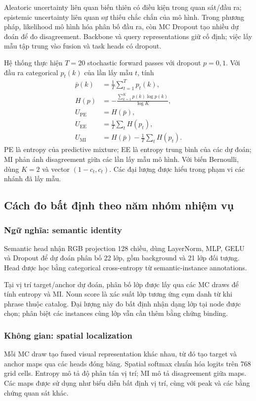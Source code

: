 \documentclass[12pt,a4paper]{article}
\begin{document}
Aleatoric uncertainty liên quan biến thiên có điều kiện trong quan sát/đầu ra; epistemic uncertainty liên quan sự thiếu chắc chắn của mô hình. Trong phương pháp, likelihood mô hình hóa phân bố đầu ra, còn MC Dropout tạo nhiều dự đoán để đo disagreement. Backbone và query representations giữ cố định; việc lấy mẫu tập trung vào fusion và task heads có dropout.

Hệ thống thực hiện $T=20$ stochastic forward passes với dropout $p=0{,}1$. Với đầu ra categorical $p_t(k)$ của lần lấy mẫu $t$, tính
\begin{align}
\bar p(k)&=\frac1T\sum_{t=1}^{T}p_t(k),\\
H(p)&=-\frac{\sum_{k=1}^{K}p(k)\log p(k)}{\log K},\\
U_{\mathrm{PE}}&=H(\bar p),\\
U_{\mathrm{EE}}&=\frac1T\sum_tH(p_t),\\
U_{\mathrm{MI}}&=H(\bar p)-\frac1T\sum_tH(p_t).
\end{align}
PE là entropy của predictive mixture; EE là entropy trung bình của các dự đoán; MI phản ánh disagreement giữa các lần lấy mẫu mô hình. Với biến Bernoulli, dùng $K=2$ và vector $(1-c_t,c_t)$. Các đại lượng được hiểu trong phạm vi các nhánh đã lấy mẫu.

\subsection{Cách đo bất định theo năm nhóm nhiệm vụ}
\subsubsection{Ngữ nghĩa: semantic identity}
Semantic head nhận RGB projection 128 chiều, dùng LayerNorm, MLP, GELU và Dropout để dự đoán phân bố 22 lớp, gồm background và 21 lớp đối tượng. Head được học bằng categorical cross-entropy từ semantic-instance annotations.

Tại vị trí target/anchor dự đoán, phân bố lớp được lấy qua các MC draws để tính entropy và MI. Noun score là xác suất lớp tương ứng cụm danh từ khi phrase thuộc catalog. Đại lượng này đo bất định nhận dạng lớp tại node được chọn; phân biệt các instances cùng lớp vẫn cần thêm bằng chứng binding.

\subsubsection{Không gian: spatial localization}
Mỗi MC draw tạo fused visual representation khác nhau, từ đó tạo target và anchor maps qua các heads đóng băng. Spatial softmax chuẩn hóa logits trên 768 grid cells. Entropy mô tả độ phân tán vị trí; MI mô tả disagreement giữa maps. Các maps được sử dụng như biểu diễn bất định vị trí, cùng với peak và các bằng chứng quan sát khác.
\end{document}
